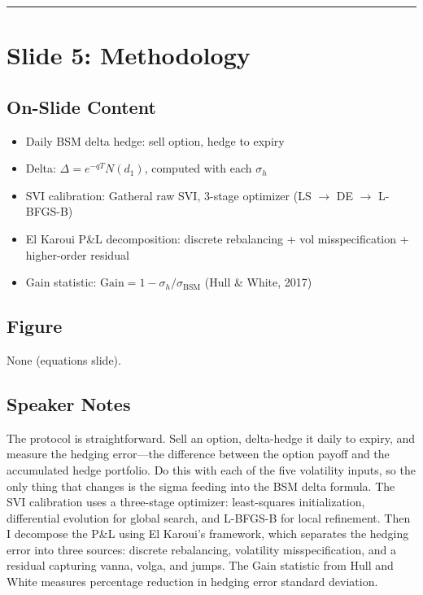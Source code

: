 \documentclass[11pt, letterpaper]{article}
\begin{document}
\noindent\rule{\textwidth}{0.4pt}

\section{Slide 5: Methodology}

\subsection*{On-Slide Content}
\begin{itemize}[nosep]
  \item Daily BSM delta hedge: sell option, hedge to expiry
  \item Delta: $\Delta = e^{-qT}N(d_1)$, computed with each $\sigma_h$
  \item SVI calibration: Gatheral raw SVI, 3-stage optimizer (LS $\rightarrow$ DE $\rightarrow$ L-BFGS-B)
  \item El Karoui P\&L decomposition: discrete rebalancing + vol misspecification + higher-order residual
  \item Gain statistic: $\text{Gain} = 1 - \sigma_h / \sigma_{\text{BSM}}$ (Hull \& White, 2017)
\end{itemize}

\subsection*{Figure}
None (equations slide).

\subsection*{Speaker Notes}
The protocol is straightforward. Sell an option, delta-hedge it daily to expiry, and measure the hedging error---the difference between the option payoff and the accumulated hedge portfolio. Do this with each of the five volatility inputs, so the only thing that changes is the sigma feeding into the BSM delta formula. The SVI calibration uses a three-stage optimizer: least-squares initialization, differential evolution for global search, and L-BFGS-B for local refinement. Then I decompose the P\&L using El Karoui's framework, which separates the hedging error into three sources: discrete rebalancing, volatility misspecification, and a residual capturing vanna, volga, and jumps. The Gain statistic from Hull and White measures percentage reduction in hedging error standard deviation.
\end{document}
